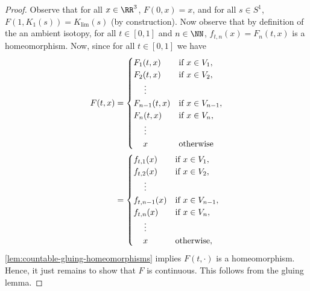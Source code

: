 \begin{proof}
  Observe that for all $x \in \RR^3$, $F(0, x) = x$, and for all $s
  \in S^1$, $F(1, K_1(s)) = K_{\lim}(s)$ (by construction). Now
  observe that by definition of the an ambient isotopy, for all $t \in
  [0,1]$ and $n \in \NN$, $f_{t,n}(x) = F_n(t, x)$ is a homeomorphism.
  Now, since for all $t \in [0,1]$ we have
  \begin{align*}
    F(t, x) &=
    \begin{cases}
      F_1(t, x) & \text{if } x \in V_1, \\
      F_2(t, x) & \text{if } x \in V_2, \\
      \hspace{1.25em}\vdots & \\
      F_{n-1}(t, x) & \text{if } x \in V_{n-1}, \\
      F_{n}(t, x) & \text{if } x \in V_{n}, \\
      \hspace{1.25em}\vdots & \\
      \hspace{1.125em} x & \text{otherwise}
    \end{cases} \\
    &=
    \begin{cases}
      f_{t,1}(x) & \text{if } x \in V_1, \\
      f_{t,2}(x) & \text{if } x \in V_2, \\
      \hspace{1.25em}\vdots & \\
      f_{t,n-1}(x) & \text{if } x \in V_{n-1}, \\
      f_{t,n}(x) & \text{if } x \in V_{n}, \\
      \hspace{1.25em}\vdots & \\
      \hspace{1.125em} x & \text{otherwise},
    \end{cases}
  \end{align*}
  \cref{lem:countable-gluing-homeomorphisms} implies $F(t, \cdot)$ is
  a homeomorphism. Hence, it just remains to show that $F$ is
  continuous. This follows from the gluing lemma.


\end{proof}
